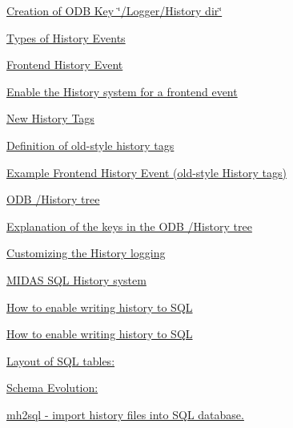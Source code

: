 \begin{TabularC}{2}
\begin{TabularC}{2}
\begin{DoxyItemize}
\begin{DoxyItemize}
\begin{DoxyItemize}
\begin{DoxyItemize}
\item \hyperlink{F_History_logging_F_Logger_Create_History_Dir}{Creation of ODB Key \char`\"{}/Logger/History dir\char`\"{}} 
\end{DoxyItemize}
\item \hyperlink{F_History_logging_F_History_Event_Types}{Types of History Events} 
\item \hyperlink{F_History_logging_F_Frontend_History_Event}{Frontend History Event} 
\begin{DoxyItemize}
\item \hyperlink{F_History_logging_F_Enable_History_Event}{Enable the History system for a frontend event} 
\begin{DoxyItemize}
\item \hyperlink{F_History_logging_F_new_history_tags}{New History Tags} 
\item \hyperlink{F_History_logging_F_history_old_tags}{Definition of old-\/style history tags} 
\end{DoxyItemize}
\item \hyperlink{F_History_logging_F_example_FE_history_event}{Example Frontend History Event (old-\/style History tags)} 
\end{DoxyItemize}
\item \hyperlink{F_History_logging_F_ODB_History_tree}{ODB /History tree} 
\item \hyperlink{F_History_logging_F_History_tree_keys}{Explanation of the keys in the ODB /History tree} 
\item \hyperlink{F_History_logging_F_customizing_History}{Customizing the History logging} 
\item \hyperlink{F_History_logging_F_History_sql_internal}{MIDAS SQL History system} 
\begin{DoxyItemize}
\item \hyperlink{F_History_logging_F_History_sql_enable}{How to enable writing history to SQL} 
\item \hyperlink{F_History_logging_F_History_sql_enable}{How to enable writing history to SQL} 
\item \hyperlink{F_History_logging_F_SQL_Layout}{Layout of SQL tables:} 
\item \hyperlink{F_History_logging_F_SQL_Schema}{Schema Evolution:} 
\end{DoxyItemize}
\item \hyperlink{F_History_logging_F_mh2sql_utility}{mh2sql -\/ import history files into SQL database.} 

\end{DoxyItemize}
\end{DoxyItemize}
\end{DoxyItemize}
\end{TabularC}
\end{TabularC}
